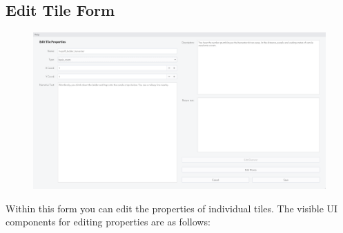 \documentclass[class=article,crop=false]{standalone} \usepackage[margin=1in,headheight=57pt,headsep=0.1in]{geometry}
\begin{document}
\subsection{Edit Tile Form}
\begin{figure}[H]
	\centering
	\includegraphics[width=1.0\textwidth]{./editTileFormBasic.png}
\end{figure}
Within this form you can edit the properties of individual tiles. The visible UI components for editing properties are as follows:
\end{document}

